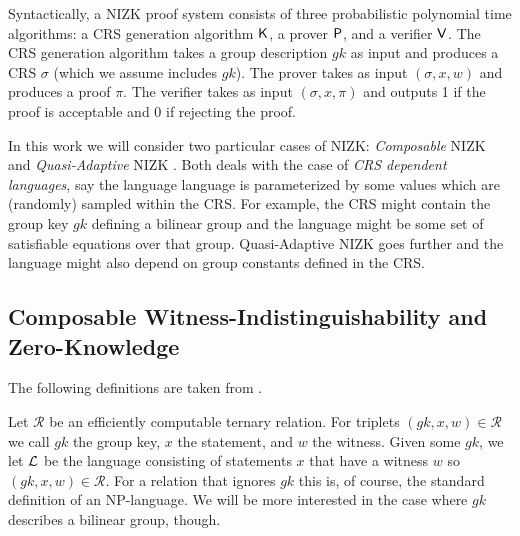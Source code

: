 Syntactically, a NIZK proof system consists of three probabilistic polynomial time algorithms: a CRS
generation algorithm $\mathsf{K}$, a prover $\mathsf{P}$, and a verifier $\mathsf{V}$.
The CRS generation algorithm takes a group description $gk$ as input and produces a CRS $\sigma$ (which we assume includes $gk$). The prover takes as input $(\sigma, x, w)$ and produces a proof $\pi$. The verifier takes as input $(\sigma, x, \pi)$ and outputs 1 if the proof is acceptable and 0 if rejecting the proof.

In this work we will consider two particular cases of NIZK: \emph{Composable} NIZK \cite{EC:GroSah08} and  \emph{Quasi-Adaptive} NIZK \cite{AC:JutRoy13}. Both deals with the case of \emph{CRS dependent languages}, say the language language is parameterized by some values which are (randomly) sampled within the CRS. For example, the CRS might contain the group key $gk$ defining a bilinear group and the language might be some set of satisfiable equations over that group. Quasi-Adaptive NIZK goes further and the language might also depend on group constants defined in the CRS.
 
\subsection{Composable Witness-Indistinguishability and Zero-Knowledge}
The following definitions are taken from \cite{SIAMJC:GroSah12}.

\begin{definition} Let $\mathcal{R}$ be an efficiently computable ternary relation.
For triplets $(gk, x, w)\in \mathcal{R}$ we call $gk$ the group key, $x$ the statement, and $w$ the witness.
Given some $gk$, we let $\mathcal{L}$ be the language consisting of statements $x$ that have a
witness $w$ so $(gk, x, w) \in \mathcal{R}$. For a relation that ignores $gk$ this is, of course, the
standard definition of an NP-language. We will be more interested in the case where
$gk$ describes a bilinear group, though.
\end{definition}

